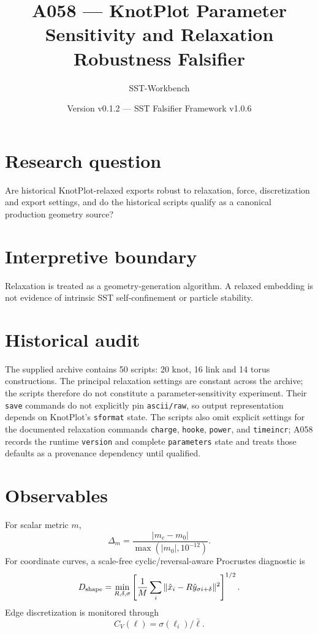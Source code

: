 \documentclass[11pt,a4paper]{article}
\title{A058 --- KnotPlot Parameter Sensitivity and Relaxation Robustness Falsifier}
\author{SST-Workbench}\date{Version v0.1.2 --- SST Falsifier Framework v1.0.6}
\newcommand{\code}[1]{\texttt{#1}}
\begin{document}
\maketitle\sloppy
\section{Research question}
Are historical KnotPlot-relaxed exports robust to relaxation, force, discretization and export settings, and do the historical scripts qualify as a canonical production geometry source?
\section{Interpretive boundary}
Relaxation is treated as a geometry-generation algorithm. A relaxed embedding is not evidence of intrinsic SST self-confinement or particle stability.
\section{Historical audit}
The supplied archive contains 50 scripts: 20 knot, 16 link and 14 torus constructions. The principal relaxation settings are constant across the archive; the scripts therefore do not constitute a parameter-sensitivity experiment. Their \code{save} commands do not explicitly pin \code{ascii/raw}, so output representation depends on KnotPlot's \code{sformat} state. The scripts also omit explicit settings for the documented relaxation commands \code{charge}, \code{hooke}, \code{power}, and \code{timeincr}; A058 records the runtime \code{version} and complete \code{parameters} state and treats those defaults as a provenance dependency until qualified.
\section{Observables}
For scalar metric $m$,
\begin{equation}\Delta_m=\frac{|m_c-m_0|}{\max(|m_0|,10^{-12})}.\end{equation}
For coordinate curves, a scale-free cyclic/reversal-aware Procrustes diagnostic is
\begin{equation}
D_{\rm shape}=\min_{R,\delta,\sigma}\left[\frac1M\sum_i\|\hat x_i-R\hat y_{\sigma i+\delta}\|^2\right]^{1/2}.
\end{equation}
Edge discretization is monitored through
\begin{equation}C_V(\ell)=\sigma(\ell_i)/\bar\ell.\end{equation}
\end{document}
